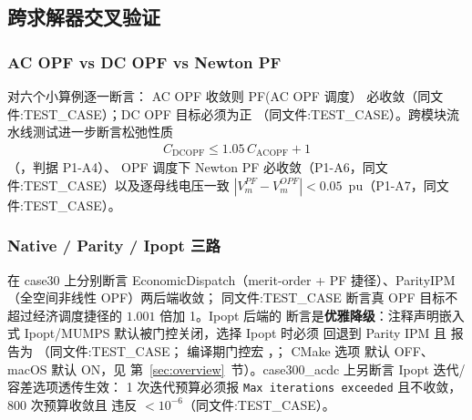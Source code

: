 \subsection{跨求解器交叉验证}\label{subsec:ver:crossval}

\subsubsection*{AC OPF vs DC OPF vs Newton PF}
 对六个小算例逐一断言：
AC OPF 收敛则 PF(AC OPF 调度） 必收敛（同文件:TEST\_CASE）；DC OPF 目标必须为正
（同文件:TEST\_CASE）。跨模块流水线测试进一步断言松弛性质
\begin{align*}
C_{\mathrm{DCOPF}} \le 1.05\,C_{\mathrm{ACOPF}} + 1
\end{align*}
（，判据 P1-A4）、
OPF 调度下 Newton PF 必收敛（P1-A6，同文件:TEST\_CASE）以及逐母线电压一致
$|V_m^{PF}-V_m^{OPF}|<0.05$~pu（P1-A7，同文件:TEST\_CASE）。

\subsubsection*{Native / Parity / Ipopt 三路}
 在 case30 上分别断言
EconomicDispatch（merit-order + PF 捷径）、ParityIPM（全空间非线性 OPF）两后端收敛；
同文件:TEST\_CASE 断言真 OPF 目标不超过经济调度捷径的 $1.001$ 倍加 1。Ipopt 后端的
断言是\textbf{优雅降级}：注释声明嵌入式 Ipopt/MUMPS 默认被门控关闭，选择 Ipopt 时必须
回退到 Parity IPM 且  报告为 （同文件:TEST\_CASE；
编译期门控宏 ，；
CMake 选项  默认 OFF、macOS 默认 ON，见
第~\ref{sec:overview}~节）。case300\_acdc 上另断言 Ipopt 迭代/容差选项透传生效：
1 次迭代预算必须报 \texttt{Max iterations exceeded} 且不收敛，800 次预算收敛且
违反 $<10^{-6}$（同文件:TEST\_CASE）。

